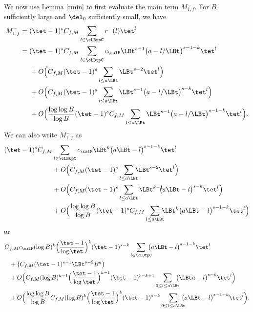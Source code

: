 We now use Lemma \ref{rmin} to first evaluate the main term $M_{1,f}^-$. For $B$ sufficiently large and $\del_0$ sufficiently small, we have
\begin{equation*}
\begin{split}
M_{1,f}^-&= (\tet -1)^s C_{f,M} \sum_{l\in\cLBtpC} r^-(l) \tet^l \\
&= (\tet -1)^s C_{f,M} \sum_{l\in\cLBtpC} c_{\calP} \LBt^{s-1} \bigl(a- l/{\LBt}\bigr)^{s-1-k}\tet^l \\
&\hspace*{5mm}+O\Bigl(C_{f,M} (\tet -1)^s \sum_{l\leq a \LBt} \LBt^{s-2} \tet^l \Bigr)\\
&\hspace*{5mm}+O\Bigl(C_{f,M}(\tet -1)^s \sum_{l\leq a \LBt} \LBt^{s-1} \bigl(a- l/{\LBt}\bigr)^{s-k} \tet^l \Bigr)\\
&\hspace*{5mm}+O\Bigl(\frac{\log \log B}{\log B} (\tet -1)^s C_{f,M} \sum_{l\leq a \LBt} \LBt^{s-1} \bigl(a- l/{\LBt}\bigr)^{s-1-k}\tet^l \Bigr).
\end{split}
\end{equation*}
We can also write $M_{1,f}^-$ as\vspace*{-3pt}
\begin{equation*}
\begin{split}
 (\tet -1)^s C_{f,M} &\sum_{l\in\cLBtpC} c_{\calP} \LBt^{k} \bigl(a \LBt - l\bigr)^{s-1-k}\tet^l \\
&+O\Bigl(C_{f,M} (\tet -1)^s \sum_{l\leq a \LBt}\hspace*{-2mm} \LBt^{s-2} \tet^l \Bigr)\\
&+O\Bigl(C_{f,M}(\tet -1)^s \sum_{l\leq a \LBt} \LBt^{k-1}\hspace*{-2mm} \bigl(a\LBt - l\bigr)^{s-k} \tet^l \Bigr)\\
&+O\Bigl(\frac{\log \log B}{\log B} (\tet -1)^s C_{f,M} \sum_{l\leq a \LBt}\hspace*{-2mm} \LBt^{k} \bigl(a \LBt - l\bigr)^{s-1-k}\tet^l\Bigr)
\end{split}
\end{equation*}
or\vspace*{-3pt}
\begin{equation*}
\begin{split}
C&_{f,M}c_{\calP} (\log B)^k \Bigl(\frac{\tet -1}{\log \tet}\Bigr)^k (\tet-1)^{s-k} \sum_{{l\in\cLBtpC}}\hspace*{-2mm} \bigl(a \LBt - l\bigr)^{s-1-k}\tet^l \\
&+\bigl(C_{f,M} (\tet -1)^{s-1} \LBt^{s-2} B^{a} \bigr)\\
&+O\Bigl(C_{f,M} (\log B)^{k-1} \Bigl(\frac{\tet -1}{\log \tet}\Bigr)^{k-1}(\tet-1)^{s-k+1} \sum_{0\leq l\leq a \LBt}\hspace*{-2mm} \bigl(\LBt a- l\bigr)^{s-k} \tet^l \Bigr)\\
&+O\Bigl(\frac{\log \log B}{\log B} C_{f,M} (\log B)^k \Bigl(\frac{\tet -1}{\log \tet}\Bigr)^k (\tet-1)^{s-k} \sum_{0\leq l\leq a \LBt}\hspace*{-2mm} \bigl(a \LBt - l\bigr)^{s-1-k}\tet^l \Bigr).
\end{split}
\end{equation*}
